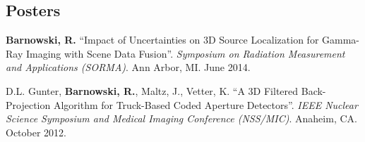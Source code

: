\documentclass[margin,line]{res}
\begin{document}
\begin{resume}
%
%
%
%
%
%
%
%
%

\section{\sc Posters}

{\bf Barnowski, R.} ``Impact of Uncertainties on 3D Source Localization for
Gamma-Ray Imaging with Scene Data Fusion''. {\it Symposium on Radiation 
Measurement and Applications (SORMA)}. Ann Arbor, MI. June 2014.

D.L. Gunter, {\bf Barnowski, R.}, Maltz, J., Vetter, K. ``A 3D Filtered 
Back-Projection Algorithm for Truck-Based Coded Aperture Detectors''. 
{\it IEEE Nuclear Science Symposium and Medical Imaging Conference (NSS/MIC)}.
Anaheim, CA. October 2012.


\end{resume}
\end{document}
